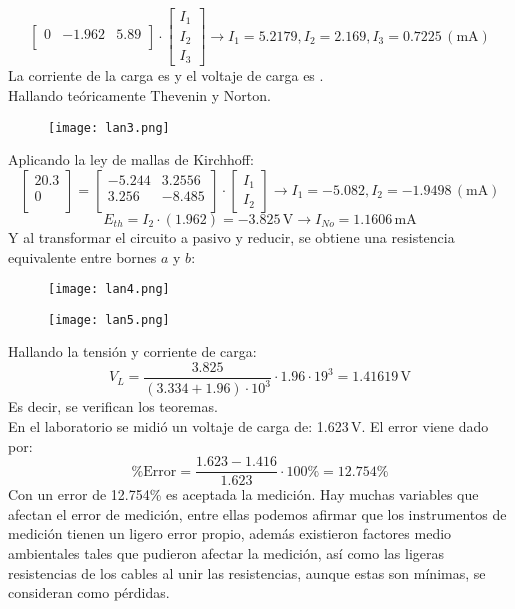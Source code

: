 \documentclass[a4paper,11pt]{report}
\begin{document}
\begin{enumerate}[label=\arabic*),font=\bfseries]
$$\begin{bmatrix}
0 & -1.962 & 5.89 \\
\end{bmatrix} \cdot \begin{bmatrix}
I_{1} \\
I_{2} \\
I_{3}
\end{bmatrix} \rightarrow I_{1} = 5.2179, I_{2} = 2.169, I_{3} = 0.7225\,(\mathrm{mA})
$$
La corriente de la carga es  y el voltaje de carga es .\\
Hallando teóricamente Thevenin y Norton.
\begin{figure}[H]
\centering
\texttt{[image: lan3.png]}
\end{figure}
Aplicando la ley de mallas de Kirchhoff:
$$
\begin{bmatrix}
20.3 \\
0 \\
\end{bmatrix} = \begin{bmatrix}
-5.244 & 3.2556 \\
3.256 & -8.485 \\
\end{bmatrix} \cdot \begin{bmatrix}
I_{1} \\
I_{2}
\end{bmatrix} \rightarrow I_{1} = -5.082, I_{2} = -1.9498\,(\mathrm{mA})
$$
$$
E_{th} = I_{2}\cdot (1.962) = -3.825\,\mathrm{V} \longrightarrow I_{No} = 1.1606\,\mathrm{mA}
$$
Y al transformar el circuito a pasivo y reducir, se obtiene una resistencia equivalente entre bornes $a$ y $b$:
\begin{figure}[H]
\centering
\texttt{[image: lan4.png]}
\end{figure}
\begin{figure}[H]
\centering
\texttt{[image: lan5.png]}
\end{figure}
Hallando la tensión y corriente de carga:
$$
V_{L} = \frac{3.825}{(3.334 + 1.96)\cdot 10^{3}}\cdot 1.96\cdot 19^{3} = 1.41619\,\mathrm{V}
$$
Es decir, se verifican los teoremas.\\
En el laboratorio se midió un voltaje de carga de: 1.623\,V. El error viene dado por:
$$
\%\mathrm{Error} = \frac{1.623 - 1.416}{1.623}\cdot 100\% = 12.754\%
$$
Con un error de 12.754\% es aceptada la medición. Hay muchas variables que afectan el error de medición, entre ellas podemos afirmar que los instrumentos de medición tienen un ligero error propio, además existieron factores medio ambientales tales que pudieron afectar la medición, así como las ligeras resistencias de los cables al unir las resistencias, aunque estas son mínimas, se consideran como pérdidas.\\

\end{enumerate}
\end{document}
